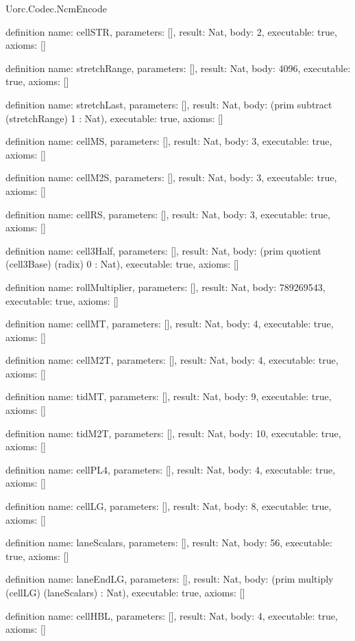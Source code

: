\begin{lexlean}{Uorc.Codec.NcmEncode}
\begin{semanticmodule}
definition{
  name: cellSTR,
  parameters: [],
  result: Nat,
  body: 2,
  executable: true,
  axioms: []
}

definition{
  name: stretchRange,
  parameters: [],
  result: Nat,
  body: 4096,
  executable: true,
  axioms: []
}

definition{
  name: stretchLast,
  parameters: [],
  result: Nat,
  body: (prim subtract (stretchRange) 1 : Nat),
  executable: true,
  axioms: []
}

definition{
  name: cellMS,
  parameters: [],
  result: Nat,
  body: 3,
  executable: true,
  axioms: []
}

definition{
  name: cellM2S,
  parameters: [],
  result: Nat,
  body: 3,
  executable: true,
  axioms: []
}

definition{
  name: cellRS,
  parameters: [],
  result: Nat,
  body: 3,
  executable: true,
  axioms: []
}

definition{
  name: cell3Half,
  parameters: [],
  result: Nat,
  body: (prim quotient (cell3Base) (radix) 0 : Nat),
  executable: true,
  axioms: []
}

definition{
  name: rollMultiplier,
  parameters: [],
  result: Nat,
  body: 789269543,
  executable: true,
  axioms: []
}

definition{
  name: cellMT,
  parameters: [],
  result: Nat,
  body: 4,
  executable: true,
  axioms: []
}

definition{
  name: cellM2T,
  parameters: [],
  result: Nat,
  body: 4,
  executable: true,
  axioms: []
}

definition{
  name: tidMT,
  parameters: [],
  result: Nat,
  body: 9,
  executable: true,
  axioms: []
}

definition{
  name: tidM2T,
  parameters: [],
  result: Nat,
  body: 10,
  executable: true,
  axioms: []
}

definition{
  name: cellPL4,
  parameters: [],
  result: Nat,
  body: 4,
  executable: true,
  axioms: []
}

definition{
  name: cellLG,
  parameters: [],
  result: Nat,
  body: 8,
  executable: true,
  axioms: []
}

definition{
  name: laneScalars,
  parameters: [],
  result: Nat,
  body: 56,
  executable: true,
  axioms: []
}

definition{
  name: laneEndLG,
  parameters: [],
  result: Nat,
  body: (prim multiply (cellLG) (laneScalars) : Nat),
  executable: true,
  axioms: []
}

definition{
  name: cellHBL,
  parameters: [],
  result: Nat,
  body: 4,
  executable: true,
  axioms: []
}


\end{semanticmodule}
\end{lexlean}

